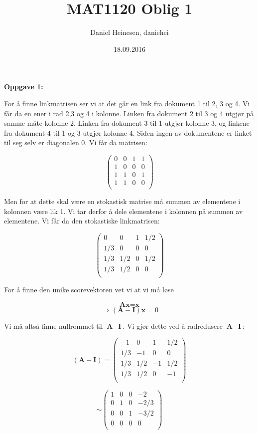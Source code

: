\documentclass[a4paper,norsk,11pt,twoside]{article}
\date{18.09.2016}
\title{MAT1120 Oblig 1}
\author{Daniel Heinesen, daniehei}
\begin{document}
\maketitle
\newpage

\textbf{Oppgave 1:}

For å finne linkmatrisen ser vi at det går en link fra dokument 1 til 2, 3 og 4. Vi får da en ener i rad 2,3 og 4 i kolonne. Linken fra dokument 2 til 3 og 4 utgjør på samme måte kolonne 2. Linken fra dokument 3 til 1 utgjør kolonne 3, og linkene fra dokument 4 til 1 og 3 utgjør kolonne 4. Siden ingen av dokumentene er linket til seg selv er diagonalen 0. Vi får da matrisen:

$$
\begin{pmatrix}
0 & 0 & 1 & 1\\
1 & 0 & 0 & 0\\
1 & 1 & 0 & 1\\
1 & 1 & 0 & 0\\
\end{pmatrix}
$$

Men for at dette skal være en stokastisk matrise må summen av elementene i kolonnen være lik 1. Vi tar derfor å dele elementene i kolonnen på summen av elementene. Vi får da den stokastiske linkmatrisen:


$$
\begin{pmatrix}
0 & 0 & 1 & 1/2\\
1/3 & 0 & 0 & 0\\
1/3 & 1/2 & 0 & 1/2\\
1/3 & 1/2 & 0 & 0\\
\end{pmatrix}
$$

For å finne den unike scorevektoren vet vi at vi må løse

$$
\textbf{A}\textbf{x} = \textbf{x}
$$
$$
\Rightarrow (\textbf{A} - \textbf{I})\textbf{x} = 0
$$

Vi må altså finne nullrommet til $\textbf{A} - \textbf{I}$. Vi gjør dette ved å radredusere $\textbf{A} - \textbf{I}$:

$$
(\textbf{A} - \textbf{I})
=\begin{pmatrix}
-1 & 0 & 1 & 1/2\\
1/3 & -1 & 0 & 0\\
1/3 & 1/2 & -1 & 1/2\\
1/3 & 1/2 & 0 & -1\\
\end{pmatrix}
$$

$$
\sim \begin{pmatrix}
1 & 0 & 0 & -2\\
0 & 1 & 0 & -2/3\\
0 & 0 & 1 & -3/2\\
0 & 0 & 0 & 0\\
\end{pmatrix}
$$
\end{document}
